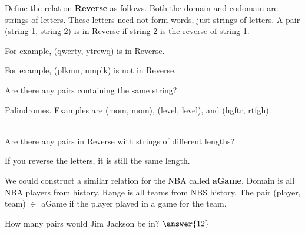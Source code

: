 \documentclass{ximera}
\begin{document}
\begin{exploration}
Define the relation \textbf{Reverse} as follows.  Both the domain and codomain are strings of letters. These letters need not form words, just strings of letters. A pair (string 1, string 2) is in Reverse if string 2 is the reverse of string 1. 

For example, (qwerty, ytrewq) is in Reverse.

For example, (plkmn, nmplk) is not in Reverse.

Are there any pairs containing the same string?
\begin{multipleChoice} 
\end{multipleChoice}
\begin{feedback}
Palindromes. Examples are (mom, mom), (level, level), and (hgftr, rtfgh).
\end{feedback}

\quad \\

Are there any pairs in Reverse with strings of different lengths?
\begin{multipleChoice} 
\end{multipleChoice}
\begin{feedback}
If you reverse the letters, it is still the same length.
\end{feedback}

\end{exploration}
We could construct a similar relation for the NBA called \textbf{aGame}.
Domain is all NBA players from history.
Range is all teams from NBS history.
The pair (player, team) $\in$ aGame if the player played in a game for the team.

How many pairs would Jim Jackson be in? $\answer{12}$




\begin{exploration}




\end{exploration}
\end{document}
